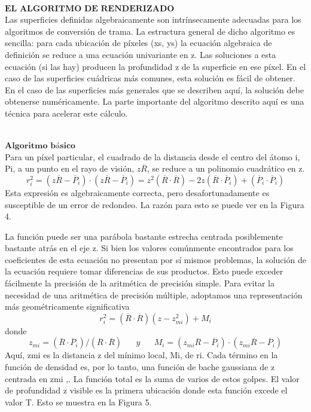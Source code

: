 ${ }$\\
$\textbf{EL ALGORITMO DE RENDERIZADO}$
${ }$\\

Las superficies definidas algebraicamente son intrínsecamente adecuadas para los algoritmos de conversión de trama. La estructura general de dicho algoritmo es sencilla: para cada ubicación de píxeles (xs, ys) la ecuación algebraica de definición se reduce a una ecuación univariante en z. Las soluciones a esta ecuación (si las hay) producen la profundidad z de la superficie en ese píxel. En el caso de las superficies cuádricas más comunes, esta solución es fácil de obtener. En el caso de las superficies más generales que se describen aquí, la solución debe obtenerse numéricamente. La parte importante del algoritmo descrito aquí es una técnica para acelerar este cálculo.

${ }$\\
$\textbf{Algoritmo básico}$
${ }$\\

Para un píxel particular, el cuadrado de la distancia desde el centro del átomo i, Pi, a un punto en el rayo de visión, $z \overline{R}$, se reduce a un polinomio cuadrático en z.
\[
	r^{2}_{i} = (z\overline{R} - \overline{P}_i)\cdot(z\overline{R} - \overline{P}_i) = z^2(\overline{R} \cdot \overline{R}) - 2 z (\overline{R} \cdot \overline{P}_i) + (\overline{P}_i \cdot \overline{P}_i)
\]
Esta expresión es algebraicamente correcta, pero desafortunadamente es susceptible de un error de redondeo. La razón para esto se puede ver en la Figura 4.

La función puede ser una parábola bastante estrecha centrada posiblemente bastante atrás en el eje z. Si bien los valores comúnmente encontrados para los coeficientes de esta ecuación no presentan por sí mismos problemas, la solución de la ecuación requiere tomar diferencias de sus productos. Esto puede exceder fácilmente la precisión de la aritmética de precisión simple. Para evitar la necesidad de una aritmética de precisión múltiple, adoptamos una representación más geométricamente significativa
\[
	r^{2}_{i} = (\overline{R} \cdot \overline{R})(z - z^{2}_{mi}) + M_i
\]
donde
\[
	z_{mi} = (\overline{R} \cdot \overline{P}_i)/(\overline{R} \cdot \overline{R}) \;\;\;\;\;\; y \;\;\;\;\;\; M_i = (z_{mi} \overline{R} - \overline{P}_i) \cdot (z_{mi} \overline{R} - \overline{P}_i)
\]
Aquí, zmi es la distancia z del mínimo local, Mi, de ri. Cada término en la función de densidad es, por lo tanto, una función de bache gaussiana de z centrada en zmi ,. La función total es la suma de varios de estos golpes. El valor de profundidad z visible es la primera ubicación donde esta función excede el valor T. Esto se muestra en la Figura 5.

